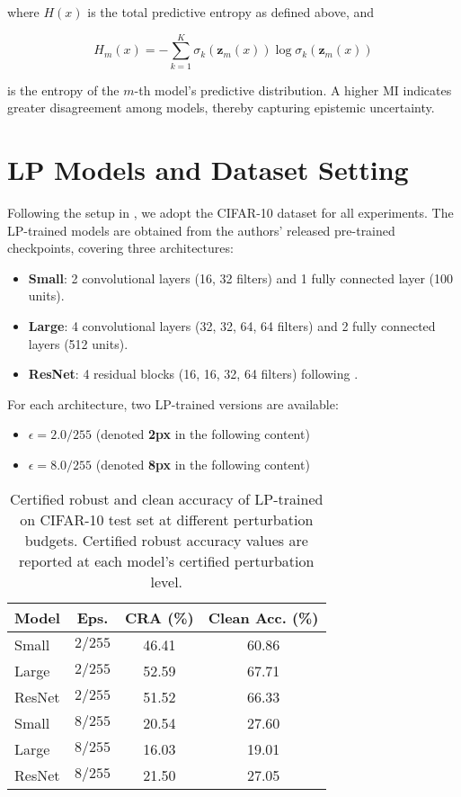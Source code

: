 where $H(x)$ is the total predictive entropy as defined above, and

\begin{equation}
H_m(x) = - \sum_{k=1}^K \sigma_k(\mathbf{z}_m(x)) \log \sigma_k(\mathbf{z}_m(x))
\end{equation}

is the entropy of the $m$-th model’s predictive distribution.
A higher MI indicates greater disagreement among models, thereby capturing epistemic uncertainty.




\section{LP Models and Dataset Setting}
\label{sec:methodology-models}
\indent

Following the setup in \cite{wong2018scaling}, we adopt the CIFAR-10 dataset for all experiments. 
The LP-trained models are obtained from the authors’ released pre-trained checkpoints, covering three architectures:
\begin{itemize}
    \item \textbf{Small}: 2 convolutional layers (16, 32 filters) and 1 fully connected layer (100 units).
    \item \textbf{Large}: 4 convolutional layers (32, 32, 64, 64 filters) and 2 fully connected layers (512 units).
    \item \textbf{ResNet}: 4 residual blocks (16, 16, 32, 64 filters) following \cite{zagoruyko2016wide}.
\end{itemize}
For each architecture, two LP-trained versions are available:
\begin{itemize}
    \item $\epsilon=2.0/255$ (denoted \textbf{2px} in the following content)
    \item $\epsilon=8.0/255$ (denoted \textbf{8px} in the following content)
\end{itemize}

\begin{table}[h]
\centering
\caption{Certified robust and clean accuracy of LP-trained on CIFAR-10 test set at different perturbation budgets.  
Certified robust accuracy values are reported at each model’s certified perturbation level.}
\label{tab:lp_cert_acc_detailed}
\begin{tabular}{lccc}
\toprule
\textbf{Model} & \textbf{Eps.} & \textbf{CRA (\%)} & \textbf{Clean Acc. (\%)} \\
\midrule
Small   & $2/255$ & 46.41 & 60.86 \\
Large   & $2/255$ & 52.59 & 67.71 \\
ResNet  & $2/255$ & 51.52 & 66.33 \\
Small   & $8/255$ & 20.54 & 27.60 \\
Large   & $8/255$ & 16.03 & 19.01 \\
ResNet  & $8/255$ & 21.50 & 27.05 \\
\bottomrule
\end{tabular}
\end{table}


